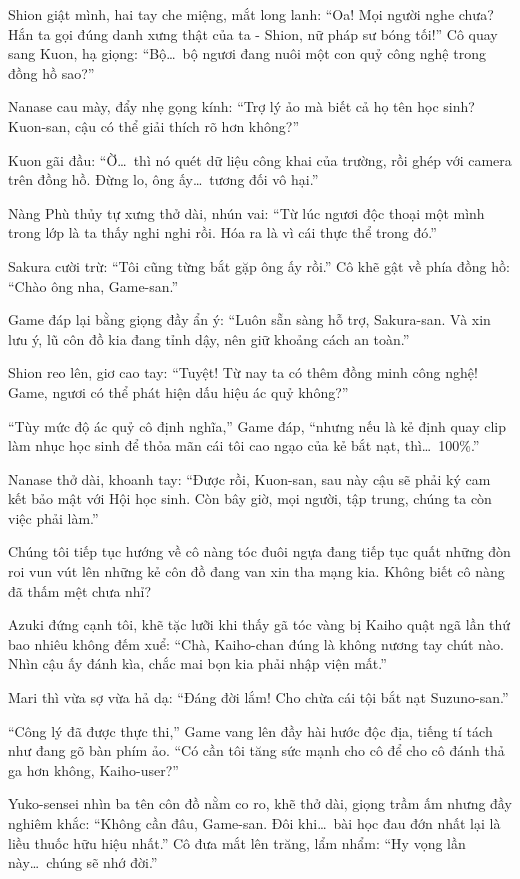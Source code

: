 \documentclass[../main.tex]{subfiles}
\begin{document}
Shion giật mình, hai tay che miệng, mắt long lanh: ``Oa! Mọi người nghe chưa? Hắn ta gọi đúng danh xưng thật của ta - Shion, nữ pháp sư bóng tối!'' Cô quay sang Kuon, hạ giọng: ``Bộ\dots\ bộ ngươi đang nuôi một con quỷ công nghệ trong đồng hồ sao?''

Nanase cau mày, đẩy nhẹ gọng kính: ``Trợ lý ảo mà biết cả họ tên học sinh? Kuon-san, cậu có thể giải thích rõ hơn không?''

Kuon gãi đầu: ``Ờ\dots\ thì nó quét dữ liệu công khai của trường, rồi ghép với camera trên đồng hồ. Đừng lo, ông ấy\dots\ tương đối vô hại.''

Nàng Phù thủy tự xưng thở dài, nhún vai: ``Từ lúc ngươi độc thoại một mình trong lớp là ta thấy nghi nghi rồi. Hóa ra là vì cái thực thể trong đó.''

Sakura cười trừ: ``Tôi cũng từng bắt gặp ông ấy rồi.'' Cô khẽ gật về phía đồng hồ: ``Chào ông nha, Game-san.''

Game đáp lại bằng giọng đầy ẩn ý: ``Luôn sẵn sàng hỗ trợ, Sakura-san. Và xin lưu ý, lũ côn đồ kia đang tỉnh dậy, nên giữ khoảng cách an toàn.''

Shion reo lên, giơ cao tay: ``Tuyệt! Từ nay ta có thêm đồng minh công nghệ! Game, ngươi có thể phát hiện dấu hiệu ác quỷ không?''

``Tùy mức độ ác quỷ cô định nghĩa,'' Game đáp, ``nhưng nếu là kẻ định quay clip làm nhục học sinh để thỏa mãn cái tôi cao ngạo của kẻ bắt nạt, thì\dots\ 100\%.''

Nanase thở dài, khoanh tay: ``Được rồi, Kuon-san, sau này cậu sẽ phải ký cam kết bảo mật với Hội học sinh. Còn bây giờ, mọi người, tập trung, chúng ta còn việc phải làm.''

Chúng tôi tiếp tục hướng về cô nàng tóc đuôi ngựa đang tiếp tục quất những đòn roi vun vút lên những kẻ côn đồ đang van xin tha mạng kia. Không biết cô nàng đã thấm mệt chưa nhỉ?

Azuki đứng cạnh tôi, khẽ tặc lưỡi khi thấy gã tóc vàng bị Kaiho quật ngã lần thứ bao nhiêu không đếm xuể: ``Chà, Kaiho-chan đúng là không nương tay chút nào. Nhìn cậu ấy đánh kìa, chắc mai bọn kia phải nhập viện mất.''

Mari thì vừa sợ vừa hả dạ: ``Đáng đời lắm! Cho chừa cái tội bắt nạt Suzuno-san.''

``Công lý đã được thực thi,'' Game vang lên đầy hài hước độc địa, tiếng tí tách như đang gõ bàn phím ảo. ``Có cần tôi tăng sức mạnh cho cô để cho cô đánh thả ga hơn không, Kaiho-user?''

Yuko-sensei nhìn ba tên côn đồ nằm co ro, khẽ thở dài, giọng trầm ấm nhưng đầy nghiêm khắc: ``Không cần đâu, Game-san. Đôi khi\dots\ bài học đau đớn nhất lại là liều thuốc hữu hiệu nhất.'' Cô đưa mắt lên trăng, lẩm nhẩm: ``Hy vọng lần này\dots\ chúng sẽ nhớ đời.''
\end{document}
